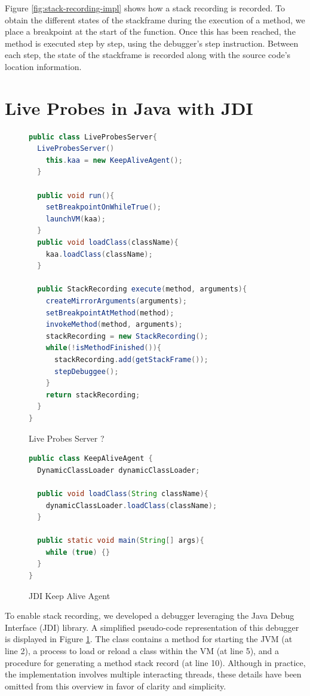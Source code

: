 \documentclass[english,submission]{programming}
\begin{document}
Figure \ref{fig:stack-recording-impl} shows how a stack recording is recorded.
To obtain the different states of the stackframe during the execution of a method, we place a breakpoint at the start of the function. 
Once this has been reached, the method is executed step by step, using the debugger's step instruction. 
Between each step, the state of the stackframe is recorded along with the source code's location information.


\section{Live Probes in Java with JDI}
\label{sec:live-probes-java}
\begin{figure}[htbp]
  \centering
  \begin{lstlisting}[language=Java]
public class LiveProbesServer{
  LiveProbesServer()
    this.kaa = new KeepAliveAgent();
  }

  public void run(){
    setBreakpointOnWhileTrue();
    launchVM(kaa);
  }
  public void loadClass(className){
    kaa.loadClass(className);
  }

  public StackRecording execute(method, arguments){
    createMirrorArguments(arguments);
    setBreakpointAtMethod(method);
    invokeMethod(method, arguments);
    stackRecording = new StackRecording();
    while(!isMethodFinished()){
      stackRecording.add(getStackFrame());
      stepDebuggee();
    }
    return stackRecording;
  }
}
  \end{lstlisting}
  \caption{Live Probes Server ?}
  \label{fig:debugger-class}
\end{figure}

\begin{figure}[htbp]
  \centering
  \begin{lstlisting}[language=Java]
public class KeepAliveAgent {
  DynamicClassLoader dynamicClassLoader;

  public void loadClass(String className){
    dynamicClassLoader.loadClass(className);
  }

  public static void main(String[] args){
    while (true) {}
  }
}
  \end{lstlisting}
  \caption{JDI Keep Alive Agent}
  \label{fig:java-keep-alive-agent}
\end{figure}

To enable stack recording, we developed a debugger leveraging the Java Debug Interface (JDI) library. 
A simplified pseudo-code representation of this debugger is displayed in Figure \ref{fig:debugger-class}. 
The class contains a method for starting the JVM (at line 2), a process to load or reload a class within the VM (at line 5), and a procedure for generating a method stack record (at line 10). Although in practice, the implementation involves multiple interacting threads, these details have been omitted from this overview in favor of clarity and simplicity.
\end{document}
